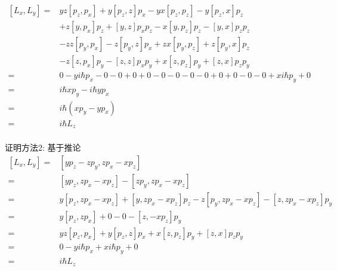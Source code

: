 \begin{frame} 
    \begin{equation*}
        \begin{split}
        [L_x,L_y]=&yz[p_z,p_x]+y[p_z,z]p_x-yx[p_z,p_z]-y[p_z,x]p_z \\ & +z[y,p_x]p_z+[y,z]p_xp_z-x[y,p_z]p_z -[y,x]p_zp_z \\ & -zz[p_y,p_x] -z[p_y,z]p_x +zx[p_y,p_z] +z[p_y,x]p_z \\ & -z[z,p_x]p_y -[z,z]p_xp_y+x[z,p_z]p_y +[z,x]p_zp_y\\  
        =&0-yi\hbar p_x-0-0+0+0-0 -0-0 -0 +0 +0-0 -0+xi\hbar p_y +0\\
        =&i\hbar xp_y-i\hbar y p_x\\
        =&i\hbar (xp_y-y p_x)\\
        =&i\hbar L_z\\    
    \end{split}  
    \end{equation*}
\end{frame} 

\begin{frame} 
    \alert{证明方法2:} 基于推论 
    \begin{equation*}
        \begin{split}
        [L_x,L_y]= &[yp_z-zp_y,zp_x-xp_z]\\
        =&[yp_z,zp_x-xp_z] - [zp_y,zp_x-xp_z]\\
        =&y[p_z,zp_x-xp_z]+[y,zp_x-xp_z]p_z- z[p_y,zp_x-xp_z]-[z,zp_x-xp_z]p_y\\
        =&y[p_z,zp_x]+0- 0-[z,-xp_z]p_y\\
        =&yz[p_z,p_x]+y[p_z,z]p_x+x[z,p_z]p_y+[z,x]p_zp_y\\
        =&0-yi\hbar p_x+x i\hbar p_y+0\\
        =&i\hbar L_z\\
    \end{split}  
    \end{equation*}
\end{frame} 

